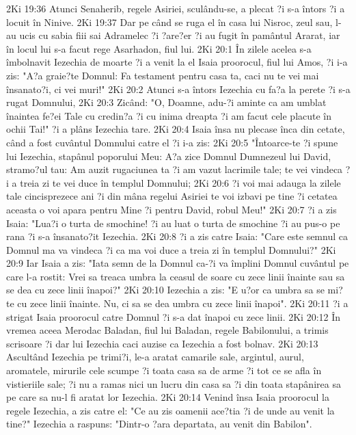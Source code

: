 2Ki 19:36  Atunci Senaherib, regele Asiriei, sculându-se, a plecat ?i s-a întors ?i a locuit în Ninive.
2Ki 19:37  Dar pe când se ruga el în casa lui Nisroc, zeul sau, l-au ucis cu sabia fiii sai Adramelec ?i ?are?er ?i au fugit în pamântul Ararat, iar în locul lui s-a facut rege Asarhadon, fiul lui.
2Ki 20:1  În zilele acelea s-a îmbolnavit Iezechia de moarte ?i a venit la el Isaia proorocul, fiul lui Amos, ?i i-a zis: "A?a graie?te Domnul: Fa testament pentru casa ta, caci nu te vei mai însanato?i, ci vei muri!"
2Ki 20:2  Atunci s-a întors Iezechia cu fa?a la perete ?i s-a rugat Domnului,
2Ki 20:3  Zicând: "O, Doamne, adu-?i aminte ca am umblat înaintea fe?ei Tale cu credin?a ?i cu inima dreapta ?i am facut cele placute în ochii Tai!" ?i a plâns Iezechia tare.
2Ki 20:4  Isaia însa nu plecase înca din cetate, când a fost cuvântul Domnului catre el ?i i-a zis:
2Ki 20:5  "Întoarce-te ?i spune lui Iezechia, stapânul poporului Meu: A?a zice Domnul Dumnezeul lui David, stramo?ul tau: Am auzit rugaciunea ta ?i am vazut lacrimile tale; te vei vindeca ?i a treia zi te vei duce în templul Domnului;
2Ki 20:6  ?i voi mai adauga la zilele tale cincisprezece ani ?i din mâna regelui Asiriei te voi izbavi pe tine ?i cetatea aceasta o voi apara pentru Mine ?i pentru David, robul Meu!"
2Ki 20:7  ?i a zis Isaia: "Lua?i o turta de smochine! ?i au luat o turta de smochine ?i au pus-o pe rana ?i s-a însanato?it Iezechia.
2Ki 20:8  ?i a zis catre Isaia: "Care este semnul ca Domnul ma va vindeca ?i ca ma voi duce a treia zi în templul Domnului?"
2Ki 20:9  Iar Isaia a zis: "Iata semn de la Domnul ca-?i va împlini Domnul cuvântul pe care l-a rostit: Vrei sa treaca umbra la ceasul de soare cu zece linii înainte sau sa se dea cu zece linii înapoi?"
2Ki 20:10  Iezechia a zis: "E u?or ca umbra sa se mi?te cu zece linii înainte. Nu, ci sa se dea umbra cu zece linii înapoi".
2Ki 20:11  ?i a strigat Isaia proorocul catre Domnul ?i s-a dat înapoi cu zece linii.
2Ki 20:12  În vremea aceea Merodac Baladan, fiul lui Baladan, regele Babilonului, a trimis scrisoare ?i dar lui Iezechia caci auzise ca Iezechia a fost bolnav.
2Ki 20:13  Ascultând Iezechia pe trimi?i, le-a aratat camarile sale, argintul, aurul, aromatele, mirurile cele scumpe ?i toata casa sa de arme ?i tot ce se afla în vistieriile sale; ?i nu a ramas nici un lucru din casa sa ?i din toata stapânirea sa pe care sa nu-l fi aratat lor Iezechia.
2Ki 20:14  Venind însa Isaia proorocul la regele Iezechia, a zis catre el: "Ce au zis oamenii ace?tia ?i de unde au venit la tine?" Iezechia a raspuns: "Dintr-o ?ara departata, au venit din Babilon".
